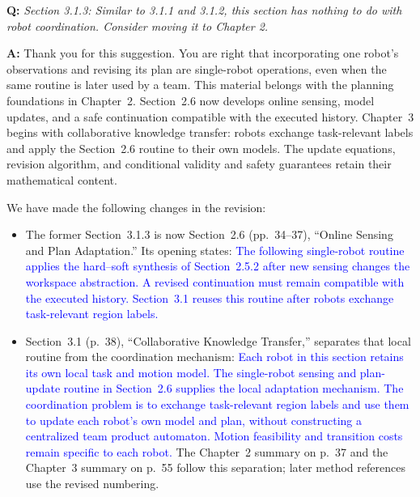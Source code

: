 \documentclass[11pt]{article}
\newcommand{\change}[1]{\textcolor{blue}{#1}}
\begin{document}
\begin{shaded*}
\noindent\textbf{Q:} \emph{Section 3.1.3: Similar to 3.1.1 and 3.1.2, this
section has nothing to do with robot coordination. Consider moving it to Chapter
2.}
\end{shaded*}
\noindent\textbf{A:} Thank you for this suggestion. You are right that
incorporating one robot's observations and revising its plan are single-robot
operations, even when the same routine is later used by a team. This material
belongs with the planning foundations in Chapter~2. Section~2.6 now develops
online sensing, model updates, and a safe continuation compatible with the
executed history. Chapter~3 begins with collaborative knowledge transfer:
robots exchange task-relevant labels and apply the Section~2.6 routine to
their own models. The update equations, revision algorithm, and conditional
validity and safety guarantees retain their mathematical content.

We have made the following changes in the revision:
\begin{itemize}
\item The former Section~3.1.3 is now Section~2.6 (pp.~34--37),
``Online Sensing and Plan Adaptation.'' Its opening states:
\change{The following single-robot routine applies the hard--soft synthesis of
Section~2.5.2 after new sensing changes the workspace
abstraction. A revised continuation must remain compatible with the executed
history. Section~3.1 reuses this routine after robots
exchange task-relevant region labels.}

\item Section~3.1 (p.~38), ``Collaborative Knowledge Transfer,'' separates
that local routine from the coordination mechanism:
\change{Each robot in this section retains its own local task and motion model.
The single-robot sensing and plan-update routine in
Section~2.6 supplies the local adaptation mechanism.
The coordination problem is to exchange task-relevant region labels and
use them to update each robot's own model and plan, without constructing
a centralized team product automaton. Motion feasibility and transition
costs remain specific to each robot.}
The Chapter~2 summary on p.~37 and the Chapter~3 summary on p.~55 follow
this separation; later method references use the revised numbering.
\end{itemize}
\end{document}
